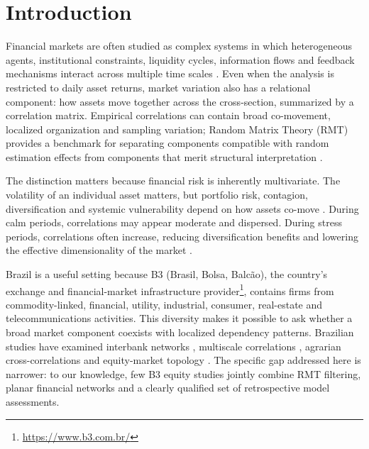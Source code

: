 \section{Introduction}
\label{sec:introduction}

Financial markets are often studied as complex systems in which heterogeneous agents, institutional constraints, liquidity cycles, information flows and feedback mechanisms interact across multiple time scales \cite{mantegna_stanley_1999_book,cont_2001_empirical}. Even when the analysis is restricted to daily asset returns, market variation also has a relational component: how assets move together across the cross-section, summarized by a correlation matrix. Empirical correlations can contain broad co-movement, localized organization and sampling variation; Random Matrix Theory (RMT) provides a benchmark for separating components compatible with random estimation effects from components that merit structural interpretation \cite{laloux_1999_noise,plerou_2002_random,bun_2017_cleaning}.

The distinction matters because financial risk is inherently multivariate. The volatility of an individual asset matters, but portfolio risk, contagion, diversification and systemic vulnerability depend on how assets co-move \cite{billio_2012_econometric}. During calm periods, correlations may appear moderate and dispersed. During stress periods, correlations often increase, reducing diversification benefits and lowering the effective dimensionality of the market \cite{junior_2012_correlation,zheng_2012_changes}.

Brazil is a useful setting because B3 (Brasil, Bolsa, Balc\~ao), the country's exchange and financial-market infrastructure provider\footnote{\url{https://www.b3.com.br/}}, contains firms from commodity-linked, financial, utility, industrial, consumer, real-estate and telecommunications activities. This diversity makes it possible to ask whether a broad market component coexists with localized dependency patterns. Brazilian studies have examined interbank networks \cite{tabak_2010_topology}, multiscale correlations \cite{pereira_2019_multiscale}, agrarian cross-correlations \cite{stosic_2015_correlations} and equity-market topology \cite{leonel_2022_brazilian}. The specific gap addressed here is narrower: to our knowledge, few B3 equity studies jointly combine RMT filtering, planar financial networks and a clearly qualified set of retrospective model assessments.

